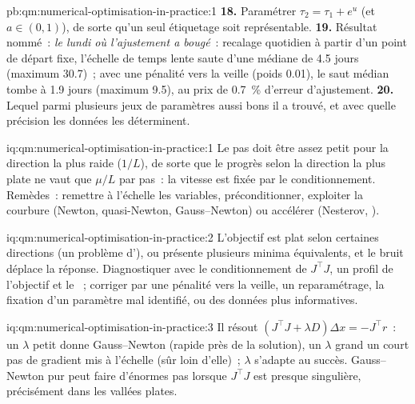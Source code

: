 \begin{solution}{pb:qm:numerical-optimisation-in-practice:1}
\textbf{18.} Paramétrer $\tau_2 = \tau_1 + e^u$ (et $a \in (0, 1)$), de sorte qu'un seul étiquetage soit représentable.
\textbf{19.} Résultat nommé~: \emph{le lundi où l'ajustement a bougé}~: recalage quotidien à partir d'un point de départ fixe, l'échelle de temps lente saute d'une médiane de 4.5 jours (maximum 30.7)~; avec une pénalité vers la veille (poids
0.01), le saut médian tombe à 1.9 jours (maximum 9.5), au prix de 0.7~\% d'erreur d'ajustement.
\textbf{20.} Lequel parmi plusieurs jeux de paramètres aussi bons il a trouvé, et avec quelle précision les données les déterminent.
\end{solution}

\begin{solution}{iq:qm:numerical-optimisation-in-practice:1}
Le pas doit être assez petit pour la direction la plus raide ($1/L$), de sorte que le progrès selon la direction la plus plate ne vaut que $\mu/L$ par pas~: la vitesse est fixée par le conditionnement. Remèdes~: remettre à l'échelle les
variables, préconditionner, exploiter la courbure (Newton, quasi-Newton, Gauss--Newton) ou accélérer (Nesterov, ).
\end{solution}

\begin{solution}{iq:qm:numerical-optimisation-in-practice:2}
L'objectif est plat selon certaines directions (un problème d'), ou présente plusieurs minima équivalents, et le bruit déplace la réponse. Diagnostiquer avec le conditionnement de $J^\top J$, un profil de
l'objectif et le ~; corriger par une pénalité vers la veille, un reparamétrage, la fixation d'un paramètre mal identifié, ou des données plus informatives.
\end{solution}

\begin{solution}{iq:qm:numerical-optimisation-in-practice:3}
Il résout $(J^\top J + \lambda D)\Delta x = -J^\top r$~: un $\lambda$ petit donne Gauss--Newton (rapide près de la solution), un $\lambda$ grand un court pas de gradient mis à l'échelle (sûr loin d'elle)~; $\lambda$ s'adapte au
succès. Gauss--Newton pur peut faire d'énormes pas lorsque $J^\top J$ est presque singulière, précisément dans les vallées plates.
\end{solution}

